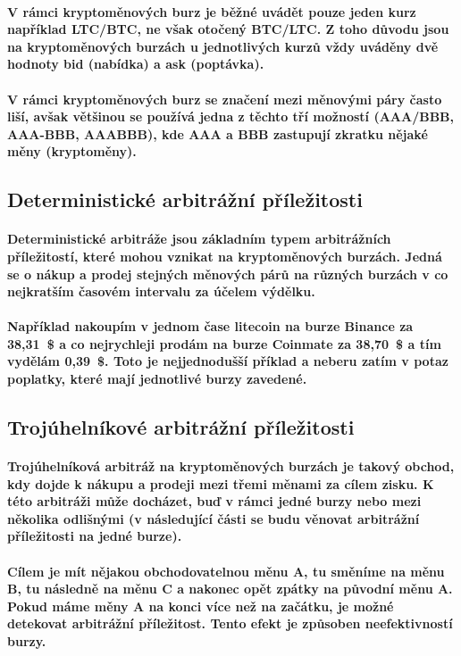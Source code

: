\documentclass[thesis=B,czech]{FITthesis}[2019/03/21]
\begin{document}
\paragraph{
V rámci kryptoměnových burz je běžné uvádět pouze jeden kurz například LTC/BTC, ne však otočený BTC/LTC. Z toho důvodu jsou na kryptoměnových burzách u jednotlivých kurzů vždy uváděny dvě hodnoty bid (nabídka) a ask (poptávka). 
}
\paragraph{
V rámci kryptoměnových burz se značení mezi měnovými páry často liší, avšak většinou se používá jedna z těchto tří možností (AAA/BBB, AAA-BBB, AAABBB), kde AAA a BBB zastupují zkratku nějaké měny (kryptoměny).
}
\subsection{Deterministické arbitrážní příležitosti}
\paragraph{
Deterministické arbitráže jsou základním typem arbitrážních příležitostí, které mohou vznikat na kryptoměnových burzách. Jedná se o nákup a prodej stejných měnových párů na různých burzách v co nejkratším časovém intervalu za účelem výdělku. \cite{CZInvestor} \cite{TowardsDataScience}
}
\paragraph{
Například nakoupím v jednom čase litecoin na burze Binance za 38,31~\$ a co nejrychleji prodám na burze Coinmate za 38,70~\$ a tím vydělám 0,39~\$. Toto je nejjednodušší příklad a neberu zatím v potaz poplatky, které mají jednotlivé burzy zavedené. 
}
\subsection{Trojúhelníkové arbitrážní příležitosti}
\paragraph{
Trojúhelníková arbitráž na kryptoměnových burzách je takový obchod, kdy dojde k nákupu a prodeji mezi třemi měnami za cílem zisku. K této arbitráži může docházet, buď v rámci jedné burzy nebo mezi několika odlišnými (v následující části se budu věnovat arbitrážní příležitosti na jedné burze). \cite{TradingStrategy}
}
\paragraph{
Cílem je mít nějakou obchodovatelnou měnu A, tu směníme na měnu B, tu následně na měnu C a nakonec opět zpátky na původní měnu A. Pokud máme měny A na konci více než na začátku, je možné detekovat arbitrážní příležitost. Tento efekt je způsoben neefektivností burzy.
}
\end{document}
